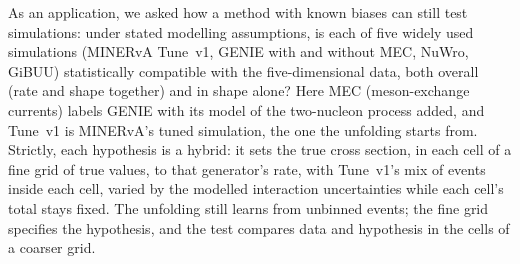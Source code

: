As an application, we asked how a method with known biases can still test simulations: under stated modelling assumptions, is each of five widely used simulations (MINERvA Tune~v1, GENIE with and without MEC, NuWro, GiBUU) statistically compatible with the five-dimensional data, both overall (rate and shape together) and in shape alone? Here MEC (meson-exchange currents) labels GENIE with its model of the two-nucleon process added, and Tune~v1 is MINERvA's tuned simulation, the one the unfolding starts from. Strictly, each hypothesis is a hybrid: it sets the true cross section, in each cell of a fine grid of true values, to that generator's rate, with Tune~v1's mix of events inside each cell, varied by the modelled interaction uncertainties while each cell's total stays fixed. The unfolding still learns from unbinned events; the fine grid specifies the hypothesis, and the test compares data and hypothesis in the cells of a coarser grid.

